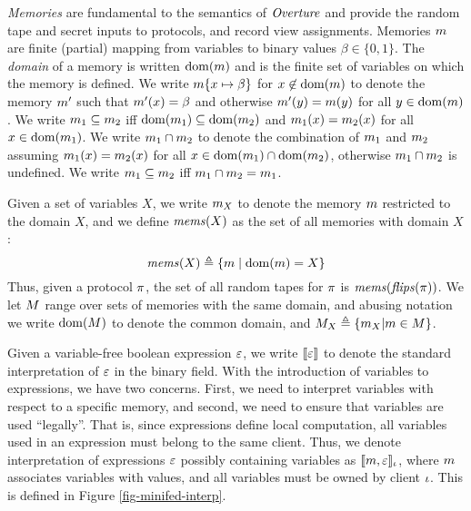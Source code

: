 \emph{Memories} are fundamental to the semantics of $\mathit{Overture}$ and
provide the random tape and secret inputs to protocols, and record
view assignments. Memories $m$ are finite (partial) mapping from
variables to binary values $\beta \in \{0,1\}$. The \emph{domain} of a
memory is written $\mathrm{dom}(m)$ and is the finite set of variables on
which the memory is defined. We write $m\{ x \mapsto \beta\}$ for
$x\not\in\mathrm{dom}(m)$ to denote the memory $m'$ such that
$m'(x) = \beta$ and otherwise $m'(y) = m(y)$ for all $y
\in \mathrm{dom}(m)$. We write $m_1 \subseteq m_2$ iff
$\mathrm{dom}(m_1) \subseteq \mathrm{dom}(m_2)$ and $m_1(x) =
m_2(x)$ for all $x \in \mathrm{dom}(m_1)$. We write $m_1 \cap
m_2$ to denote the combination of $m_1$ and $m_2$
assuming $m_1(x) = m_2(x)$ for all $x \in \mathrm{dom}(m_1)
\cap \mathrm{dom}(m_2)$, otherwise $m_1 \cap m_2$ is undefined.
We write $m_1 \subseteq m_2$ iff $m_1 \cap m_2
= m_1$.

Given a set of variables $X$, we write $m_X$ to denote the
memory $m$ restricted to the domain $X$, and we define
$\mathit{mems}(X)$ as the set of all memories with domain $X$:
$$
\mathit{mems}(X) \triangleq \{ m \mid \mathrm{dom}(m) = X \}
$$
Thus, given a protocol $\pi$, the set of all random tapes for
$\pi$ is $\mathit{mems}(\mathit{flips}(\pi))$. We let $M$ range
over sets of memories with the same domain, and abusing notation
we write $\mathrm{dom}(M)$ to denote the common domain,
and $M_X \triangleq \{ m_X | m \in M \}$.

Given a variable-free boolean expression $\varepsilon$, we write $\llbracket \varepsilon \rrbracket$
to denote the standard interpretation of $\varepsilon$ in the binary field.
With the introduction of variables to expressions, we have two
concerns. First, we need to interpret variables with respect to a
specific memory, and second, we need to ensure that variables are used
``legally''. That is, since expressions define local computation, all
variables used in an expression must belong to the same client.  Thus,
we denote interpretation of expressions $\varepsilon$ possibly containing
variables as $\llbracket m,\varepsilon \rrbracket_{\iota}$, where $m$ associates
variables with values, and all variables must be owned by client
$\iota$. This is defined in Figure \ref{fig-minifed-interp}.

